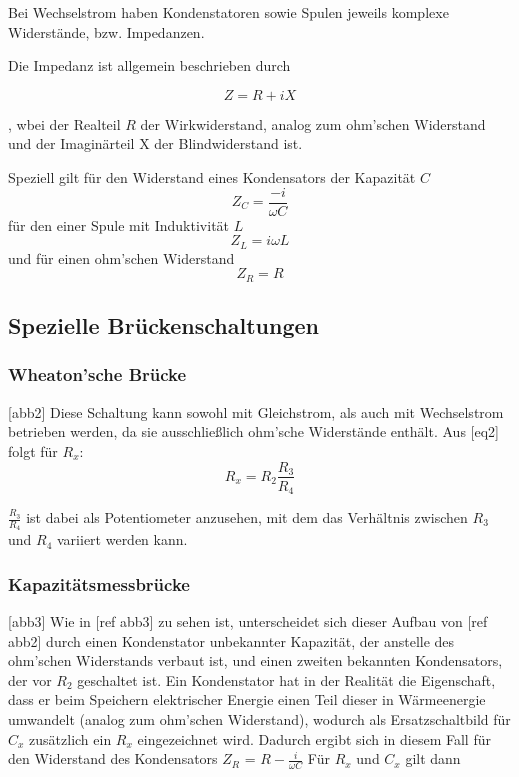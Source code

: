 Bei Wechselstrom haben Kondenstatoren sowie Spulen jeweils komplexe Widerstände, bzw. Impedanzen.

Die Impedanz ist allgemein beschrieben durch

\begin{equation}
    Z = R + iX
\end{equation}

, wbei der Realteil $R$ der Wirkwiderstand, analog zum ohm'schen Widerstand und  der Imaginärteil
X der Blindwiderstand ist. 

Speziell gilt für den Widerstand eines Kondensators der Kapazität $C$ \begin{equation}
    Z_C = \frac{-i}{\omega C}
\end{equation} für den einer Spule mit Induktivität $L$ \begin{equation}
    Z_L = i\omega L
\end{equation} und für einen ohm'schen Widerstand \begin{equation}
    Z_R = R
\end{equation}

\subsection{Spezielle Brückenschaltungen}

\subsubsection{Wheaton'sche Brücke}
[abb2]
Diese Schaltung kann sowohl mit Gleichstrom, als auch mit Wechselstrom betrieben werden, da sie ausschließlich
ohm'sche Widerstände enthält. 
Aus [eq2] folgt für $R_x$:
\begin{equation}
    R_x = R_2 \frac{R_3}{R_4}
\end{equation}

$\frac{R_3}{R_4}$ ist dabei als Potentiometer anzusehen, mit dem das Verhältnis zwischen $R_3$ und $R_4$ 
variiert werden kann. 

\subsubsection{Kapazitätsmessbrücke}
[abb3]
Wie in [ref abb3] zu sehen ist, unterscheidet sich dieser Aufbau von [ref abb2] durch 
einen Kondenstator unbekannter Kapazität, der anstelle des ohm'schen Widerstands verbaut ist, und einen zweiten
bekannten Kondensators, der vor $R_2$ geschaltet ist. 
Ein Kondenstator hat in der 
Realität die Eigenschaft, dass er beim Speichern elektrischer Energie einen Teil dieser in Wärmeenergie umwandelt
(analog zum ohm'schen Widerstand),
wodurch als Ersatzschaltbild für $C_x$ zusätzlich ein $R_x$ eingezeichnet wird. 
Dadurch ergibt sich in diesem Fall für den Widerstand des Kondensators $ Z_R$ = $R - \frac{i}{\omega C}$
Für $R_x$ und $C_x$ gilt dann 

